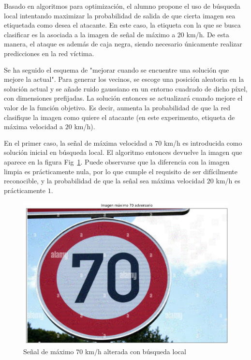 Basado en algoritmos para optimización, el alumno propone el uso de búsqueda local intentando maximizar la probabilidad de salida de que cierta imagen sea etiquetada como desea el atacante. En este caso, la etiqueta con la que se busca clasificar es la asociada a la imagen de señal de máximo a $20$ km/h. De esta manera, el ataque es además de caja negra, siendo necesario únicamente realizar predicciones en la red víctima.

Se ha seguido el esquema de "mejorar cuando se encuentre una solución que mejore la actual". Para generar los vecinos, se escoge una posición aleatoria en la solución actual y se añade ruido gaussiano en un entorno cuadrado de dicho píxel, con dimensiones prefijadas. La solución entonces se actualizará cuando mejore el valor de la función objetivo. Es decir, aumenta la probabilidad de que la red clasifique la imagen como quiere el atacante (en este experimento, etiqueta de máxima velocidad a $20$ km/h).

En el primer caso, la señal de máxima velocidad a $70$ km/h es introducida como solución inicial en búsqueda local. El algoritmo entonces devuelve la imagen que aparece en la figura Fig~\ref{fig:blmax70}. Puede observarse que la diferencia con la imagen limpia es prácticamente nula, por lo que cumple el requisito de ser difícilmente reconocible, y la probabilidad de que la señal sea máxima velocidad $20$ km/h es prácticamente $1$.

\begin{figure}[H]
    \centering
        \centering
        \includegraphics[width=\textwidth]{img/max_70_detectada_como_max_20.png}
        \caption{Señal de máximo $70$ km/h alterada con búsqueda local}
        \label{fig:blmax70}
\end{figure}

